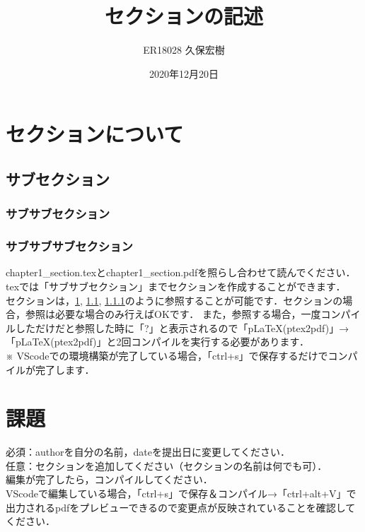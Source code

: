 \documentclass[a4paper,10pt]{jsarticle}
\title{セクションの記述}%
\author{ER18028 久保宏樹}%
\date{2020年12月20日}%
\begin{document}
\maketitle%
\section{セクションについて}
\label{sec:label1}
\subsection{サブセクション}
\label{sec:label2}
\subsubsection{サブサブセクション}
\label{sec:label3}
\subsubsection{サブサブサブセクション}
\label{sec:label4}
chapter1\_section.texとchapter1\_section.pdfを照らし合わせて読んでください．\\

texでは「サブサブセクション」までセクションを作成することができます．\\
セクションは，\ref{sec:label1}, \ref{sec:label2}, \ref{sec:label3}のように参照することが可能です．セクションの場合，参照は必要な場合のみ行えばOKです．
また，参照する場合，一度コンパイルしただけだと参照した時に「?」と表示されるので「pLaTeX(ptex2pdf)」→「pLaTeX(ptex2pdf)」と2回コンパイルを実行する必要があります．\\
※ VScodeでの環境構築が完了している場合，「ctrl+s」で保存するだけでコンパイルが完了します．

\section{課題}
\noindent 必須：authorを自分の名前，dateを提出日に変更してください．\\
任意：セクションを追加してください（セクションの名前は何でも可）．\\

\noindent 編集が完了したら，コンパイルしてください．\\
VScodeで編集している場合，「ctrl+s」で保存＆コンパイル→「ctrl+alt+V」で出力されるpdfをプレビューできるので変更点が反映されていることを確認してください．
\end{document}
